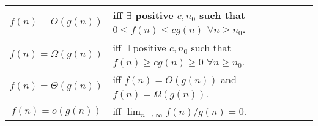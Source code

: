 \begin{tabu} to \linewidth {c|X[c,m]}
  $f(n) = O(g(n))$ & iff $\exists$ positive $c, n_0$ such that $0 \leq f(n) \leq
  cg(n)$ $\forall n \geq n_0$. \\ \hline
  $f(n) = \Omega(g(n))$ & iff $\exists$ positive $c, n_0$ such that
  $f(n) \geq cg(n) \geq 0$ $\forall n \geq n_0$. \\ \hline
  $f(n) = \Theta(g(n))$ & \vspace{0.7\baselineskip} iff $f(n) = O(g(n))$ and
  $f(n) = \Omega(g(n))$. \newline \vspace{-0.2\baselineskip}
  \\ \hline
  $f(n) = o(g(n))$ & \vspace{0.7\baselineskip} iff $\lim_{n \to \infty}
  f(n)/g(n) = 0$. \newline \vspace{-0.2\baselineskip} \\ \hline
\end{tabu}
